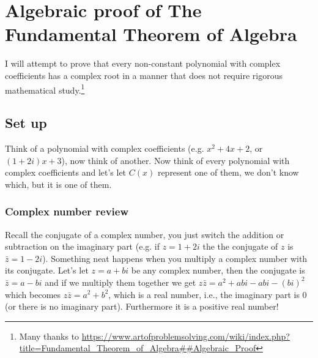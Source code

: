\documentclass[12pt]{article}
\begin{document}
\section*{Algebraic proof of The Fundamental Theorem of Algebra}
I will attempt to prove that every non-constant polynomial with complex coefficients has a complex root in a manner that does not require rigorous mathematical study.\footnote{Many thanks to \url{https://www.artofproblemsolving.com/wiki/index.php?title=Fundamental_Theorem_of_Algebra##Algebraic_Proof}}\\

%

\subsection*{Set up}
Think of a polynomial with complex coefficients (e.g. $x^2+4x+2$, or $(1+2i)x+3$), now think of another.  Now think of every polynomial with complex coefficients and let's let $C(x)$ represent one of them, we don't know which, but it is one of them.\\

\subsubsection*{Complex number review}
Recall the conjugate of a complex number, you just switch the addition or subtraction on the imaginary part (e.g. if $z = 1+2i$ the the conjugate of $z$ is $\bar{z} = 1 - 2i$).  Something neat happens when you multiply a complex number with its conjugate. Let's let $z=a+bi$ be any complex number, then the conjugate is $\bar{z}=a-bi$ and if we multiply them together we get $z\bar{z}=a^2+abi-abi-(bi)^2$ which becomes $z\bar{z}=a^2+b^2$, which is a real number, i.e., the imaginary part is 0 (or there is no imaginary part).  Furthermore it is a positive real number!\\
\end{document}
